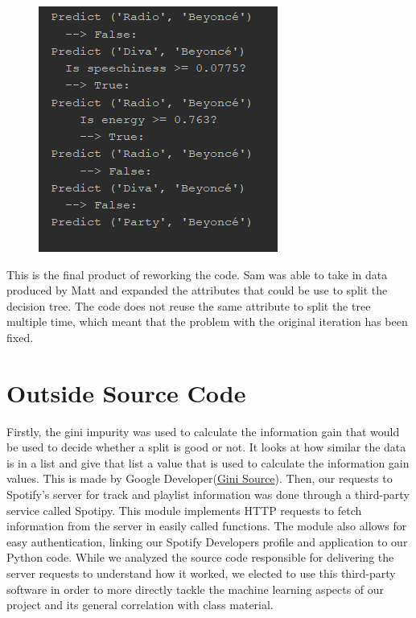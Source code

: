 \documentclass[]{report}
\begin{document}
	\begin{minipage}{0.5\textwidth}
		\begin{figure}[H]
			\includegraphics{decision_tree_at_work}
		\end{figure}
	\end{minipage} \hfill
	\begin{minipage}{0.45\textwidth}
			This is the final product of reworking the code. Sam was able to take in data produced by Matt and expanded the attributes that could be use to split the decision tree. The code does not reuse the same attribute to split the tree multiple time, which meant that the problem with the original iteration has been fixed.
	\end{minipage}

	\section{Outside Source Code}
	Firstly, the gini impurity was used to calculate the information gain that would be used to decide whether a split is good or not. It looks at how similar the data is in a list and give that list a value that is used to calculate the information gain values. This is made by Google Developer(\href{https://github.com/random-forests/tutorials/blob/master/decision\_tree.py}{Gini Source}). Then, our requests to Spotify's server for track and playlist information was done through a third-party service called Spotipy.  This module implements HTTP requests to fetch information from the server in easily called functions.  The module also allows for easy authentication, linking our Spotify Developers profile and application to our Python code.  While we analyzed the source code responsible for delivering the server requests to understand how it worked, we elected to use this third-party software in order to more directly tackle the machine learning aspects of our project and its general correlation with class material.
	
\end{document}
